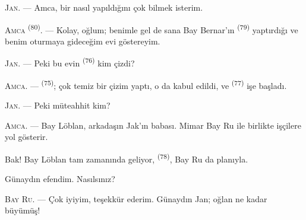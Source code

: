 %
%
%

\VUsaut{6.0mm}
\VUsaut{1.4mm}
\VUsaut{2.2mm}

\VUsaut{3.0mm}

\textsc{Jan}. --- Amca, bir  nasıl yapıldığını çok bilmek
isterim.

\textsc{Amca} \textsuperscript{(80)}. --- Kolay, oğlum; benimle gel de sana
Bay Bernar'ın \textsuperscript{(79)} yaptırdığı ve benim oturmaya gideceğim
evi göstereyim.

\textsc{Jan}. --- Peki bu evin  \textsuperscript{(76)} kim
çizdi?

\textsc{Amca}. ---  \textsuperscript{(75)}; çok temiz bir çizim
yaptı, o da kabul edildi, ve  \textsuperscript{(77)} işe
başladı.

\textsc{Jan}. --- Peki müteahhit kim?

\textsc{Amca}. --- Bay Löblan, arkadaşın Jak'ın babası. Mimar Bay Ru ile
birlikte işçilere yol gösterir.

Bak! Bay Löblan tam zamanında geliyor, 
\textsuperscript{(78)}, Bay Ru da planıyla.

Günaydın efendim. Nasılsınız?

\textsc{Bay Ru}. --- Çok iyiyim, teşekkür ederim. Günaydın Jan; oğlan ne kadar
büyümüş!

